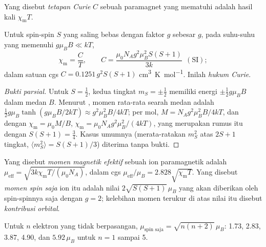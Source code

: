 \begin{definition}\label{def:b3:complex-spectra-magnetism:curie}
Yang disebut \emph{tetapan Curie} $C$ sebuah paramagnet yang mematuhi
 adalah hasil kali $\chi_{\mathrm m}T$.
\end{definition}

\begin{theorem}\label{thm:b3:complex-spectra-magnetism:curie}
Untuk spin-spin $S$ yang saling bebas dengan faktor $g$ sebesar $g$, pada suhu-suhu yang memenuhi $g\mu_BB \ll kT$,
\[
  \chi_{\mathrm m} = \frac{C}{T}, \qquad C = \frac{\mu_0N_Ag^2\mu_B^2S(S+1)}{3k}\ \ (\text{SI});
\]
dalam satuan cgs $C = 0.1251\,g^2S(S+1)$ \unit{cm^3.K.mol^{-1}}. Inilah \emph{hukum Curie}.
\end{theorem}

\begin{proof}[Bukti parsial]
Untuk $S = \frac12$, kedua tingkat $m_S = \pm\frac12$ memiliki energi $\pm\frac12g\mu_BB$ dalam medan $B$. Menurut
, momen rata-rata searah medan adalah $\frac12g\mu_B\tanh(g\mu_BB/2kT) \approx
g^2\mu_B^2B/4kT$; per mol, $M = N_Ag^2\mu_B^2B/4kT$, dan dengan $\chi_{\mathrm m} = \mu_0M/B$, $\chi_{\mathrm m} = \mu_0N_Ag^2\mu_B^2/(4kT)$,
yang merupakan rumus itu dengan $S(S+1) = \frac34$. Kasus umumnya (merata-ratakan $m_S^2$ atas $2S + 1$
tingkat, $\langle m_S^2\rangle = S(S+1)/3$) diterima tanpa bukti.
\end{proof}

\begin{definition}\label{def:b3:complex-spectra-magnetism:moment}
Yang disebut \emph{momen magnetik efektif} sebuah
ion paramagnetik adalah $\mu_{\mathrm{eff}} = \sqrt{3k\chi_{\mathrm m}T/(\mu_0N_A)}$, dalam cgs $\mu_{\mathrm{eff}}/\mu_B = 2.828\sqrt{\chi_{\mathrm m}T}$.
Yang disebut \emph{momen spin saja} ion itu adalah nilai $2\sqrt{S(S+1)}\,\mu_B$ yang
akan diberikan oleh spin-spinnya saja dengan $g = 2$; kelebihan momen terukur di atas nilai itu
disebut \emph{kontribusi orbital}.
\end{definition}

\begin{proposition}\label{prop:b3:complex-spectra-magnetism:spin-only}
Untuk $n$ elektron yang tidak berpasangan, $\mu_{\text{spin saja}} = \sqrt{n(n+2)}\,\mu_B$: 1.73, 2.83, 3.87, 4.90, dan $5.92\,\mu_B$ untuk
$n = 1$ sampai 5.
\end{proposition}

